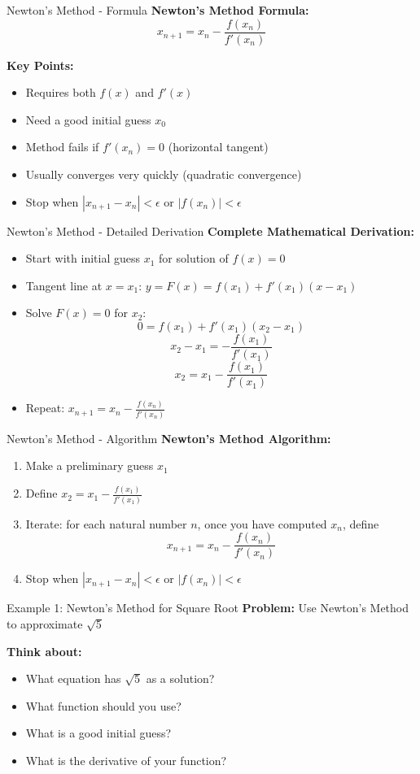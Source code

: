 \documentclass[aspectratio=169]{beamer}
\begin{document}
\begin{frame}{Newton's Method - Formula}
\textbf{Newton's Method Formula:}
\[x_{n+1} = x_n - \frac{f(x_n)}{f'(x_n)}\]

\textbf{Key Points:}
\begin{itemize}
    \item Requires both $f(x)$ and $f'(x)$
    \item Need a good initial guess $x_0$
    \item Method fails if $f'(x_n) = 0$ (horizontal tangent)
    \item Usually converges very quickly (quadratic convergence)
    \item Stop when $|x_{n+1} - x_n| < \epsilon$ or $|f(x_n)| < \epsilon$
\end{itemize}
\end{frame}

\begin{frame}{Newton's Method - Detailed Derivation}
\textbf{Complete Mathematical Derivation:}
\begin{itemize}
    \item Start with initial guess $x_1$ for solution of $f(x) = 0$
    \item Tangent line at $x = x_1$: $y = F(x) = f(x_1) + f'(x_1)(x - x_1)$
    \item Solve $F(x) = 0$ for $x_2$:
    \[0 = f(x_1) + f'(x_1)(x_2 - x_1)\]
    \[x_2 - x_1 = -\frac{f(x_1)}{f'(x_1)}\]
    \[x_2 = x_1 - \frac{f(x_1)}{f'(x_1)}\]
    \item Repeat: $x_{n+1} = x_n - \frac{f(x_n)}{f'(x_n)}$
\end{itemize}
\end{frame}

\begin{frame}{Newton's Method - Algorithm}
\textbf{Newton's Method Algorithm:}
\begin{enumerate}
    \item Make a preliminary guess $x_1$
    \item Define $x_2 = x_1 - \frac{f(x_1)}{f'(x_1)}$
    \item Iterate: for each natural number $n$, once you have computed $x_n$, define
    \[x_{n+1} = x_n - \frac{f(x_n)}{f'(x_n)}\]
    \item Stop when $|x_{n+1} - x_n| < \epsilon$ or $|f(x_n)| < \epsilon$
\end{enumerate}
\end{frame}

\begin{frame}{Example 1: Newton's Method for Square Root}
\textbf{Problem:} Use Newton's Method to approximate $\sqrt{5}$

\textbf{Think about:}
\begin{itemize}
    \item What equation has $\sqrt{5}$ as a solution?
    \item What function should you use?
    \item What is a good initial guess?
    \item What is the derivative of your function?
\end{itemize}
\end{frame}
\end{document}
